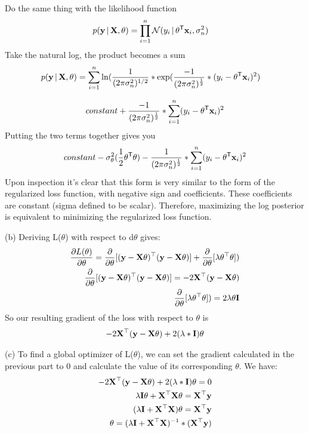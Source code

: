 \documentclass[submit]{harvardml}
\begin{document}
\bigskip \noindent Do the same thing with the likelihood function
\begin{align*}
p(\mathbf{y} \,|\, \mathbf{X}, \theta) &= \prod_{i=1}^n \mathcal{N}(y_i \,|\, \theta^{\mathsf{T}} \mathbf{x}_i, \sigma^2_n)
\end{align*}
\bigskip \noindent Take the natural log, the product becomes a sum
\begin{align*}
p(\mathbf{y} \,|\, \mathbf{X}, \theta) &= \sum_{i=1}^n \ln(\frac{1}{(2\pi\sigma_n^{2})^{1/2}} * \exp(\frac{-1}{(2\pi\sigma^2_n)^{\frac{1}{2}}}*(y_i - \theta^{\mathsf{T}} \mathbf{x}_i)^{2})
\end{align*}

\begin{align*}
constant + \frac{-1}{(2\pi\sigma^2_n)^{\frac{1}{2}}}*\sum_{i=1}^n(y_i - \theta^{\mathsf{T}} \mathbf{x}_i)^{2}
\end{align*}
Putting the two terms together gives you
\begin{align*}
constant -\sigma^2_\theta(\frac{1}{2}\theta^{\mathsf{T}} \theta) - \frac{1}{(2\pi\sigma^2_n)^{\frac{1}{2}}}*\sum_{i=1}^n(y_i - \theta^{\mathsf{T}} \mathbf{x}_i)^{2}
\end{align*}
Upon inspection it's clear that this form is very similar to the form of the regularized loss function, with negative sign and coefficients. These coefficients are constant (sigma defined to be scalar). Therefore, maximizing the log posterior is equivalent to minimizing the regularized loss function.

\bigskip \noindent (b) Deriving L($\theta$) with respect to d$\theta$ gives:
\begin{align*}
\frac{\partial L(\theta)}{\partial \theta} = \frac{\partial}{\partial \theta}[(\mathbf{y} - \mathbf{X} \theta)^\top (\mathbf{y} - \mathbf{X}\theta)] + \frac{\partial}{\partial \theta}[\lambda \theta^\top \theta]) \\
\frac{\partial}{\partial \theta}[(\mathbf{y} - \mathbf{X} \theta)^\top (\mathbf{y} - \mathbf{X}\theta)] = -2\mathbf{X}^\top(\mathbf{y} - \mathbf{X}\theta) \\
\frac{\partial}{\partial \theta}[\lambda \theta^\top \theta]) = 2\lambda\theta\mathbf{I}
\end{align*}
So our resulting gradient of the loss with respect to $\theta$ is
\begin{align*}
    -2\mathbf{X}^\top(\mathbf{y} - \mathbf{X}\theta) + 2(\lambda*\mathbf{I})\theta
\end{align*}

\bigskip \noindent (c) To find a global optimizer of L($\theta$), we can set the gradient calculated in the previous part to 0 and calculate the value of its corresponding $\theta$. We have:
\begin{align*}
-2\mathbf{X}^\top(\mathbf{y} - \mathbf{X}\theta) + 2(\lambda*\mathbf{I})\theta = 0 \\ 
\lambda\mathbf{I}\theta + \mathbf{X}^\top\mathbf{X}\theta = \mathbf{X}^\top\mathbf{y} \\
(\lambda\mathbf{I} + \mathbf{X}^\top\mathbf{X})\theta = \mathbf{X}^\top\mathbf{y} \\
\theta = (\lambda\mathbf{I} + \mathbf{X}^\top\mathbf{X})^{-1} * (\mathbf{X}^\top\mathbf{y})
\end{align*}
\end{document}
